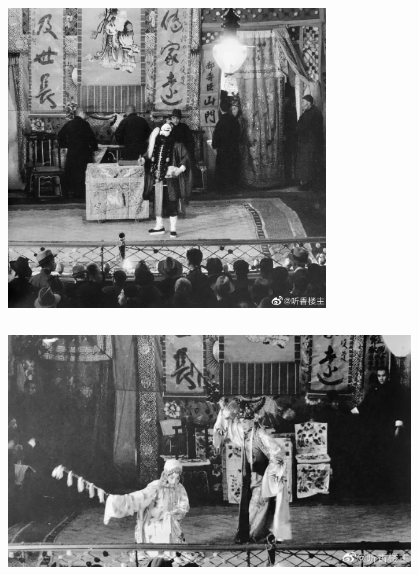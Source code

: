 \documentclass[cjk,slidestop,compress,mathserif,blue]{beamer}
\begin{document}
\frame
{
	\frametitle{}
\begin{figure}[h!]
\centering
\vspace{-0.15in}
\includegraphics[height=0.70\textwidth,width=0.75\textwidth, clip]{Figures/PekOpe_His-1.jpg}
\label{History-1}
\end{figure}
}

\frame
{
	\frametitle{}
\begin{figure}[h!]
\centering
\vspace{-0.10in}
\includegraphics[height=0.60\textwidth,width=0.95\textwidth, clip]{Figures/PekOpe_His-2.jpg}
\label{History-2}
\end{figure}
}
\end{document}
